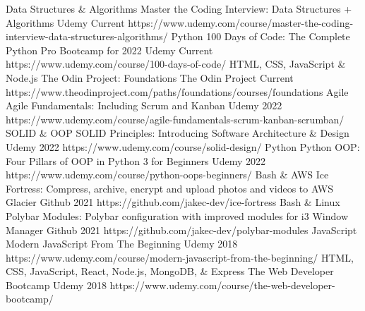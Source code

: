 \begin{cvhonors}
  \cvhonor
    {Data Structures \& Algorithms}
    {Master the Coding Interview: Data Structures + Algorithms}
    {Udemy}
    {Current}
    {https://www.udemy.com/course/master-the-coding-interview-data-structures-algorithms/}
  \cvhonor
    {Python}
    {100 Days of Code: The Complete Python Pro Bootcamp for 2022}
    {Udemy}
    {Current}
    {https://www.udemy.com/course/100-days-of-code/}
  \cvhonor
    {HTML, CSS, JavaScript \& Node.js}
    {The Odin Project: Foundations}
    {The Odin Project}
    {Current}
    {https://www.theodinproject.com/paths/foundations/courses/foundations}
  \cvhonor
    {Agile}
    {Agile Fundamentals: Including Scrum and Kanban}
    {Udemy}
    {2022}
    {https://www.udemy.com/course/agile-fundamentals-scrum-kanban-scrumban/}
  \cvhonor
    {SOLID \& OOP}
    {SOLID Principles: Introducing Software Architecture \& Design}
    {Udemy}
    {2022}
    {https://www.udemy.com/course/solid-design/}
  \cvhonor
    {Python}
    {Python OOP: Four Pillars of OOP in Python 3 for Beginners}
    {Udemy}
    {2022}
    {https://www.udemy.com/course/python-oops-beginners/}
  \cvhonor
    {Bash \& AWS}
    {Ice Fortress: Compress, archive, encrypt and upload photos and videos to AWS Glacier}
    {Github}
    {2021}
    {https://github.com/jakec-dev/ice-fortress}
  \cvhonor
    {Bash \& Linux}
    {Polybar Modules: Polybar configuration with improved modules for i3 Window Manager}
    {Github}
    {2021}
    {https://github.com/jakec-dev/polybar-modules}
  \cvhonor
    {JavaScript}
    {Modern JavaScript From The Beginning}
    {Udemy}
    {2018}
    {https://www.udemy.com/course/modern-javascript-from-the-beginning/}
  \cvhonor
    {HTML, CSS, JavaScript, React, Node.js, MongoDB, \& Express}
    {The Web Developer Bootcamp}
    {Udemy}
    {2018}
    {https://www.udemy.com/course/the-web-developer-bootcamp/}
\end{cvhonors}
